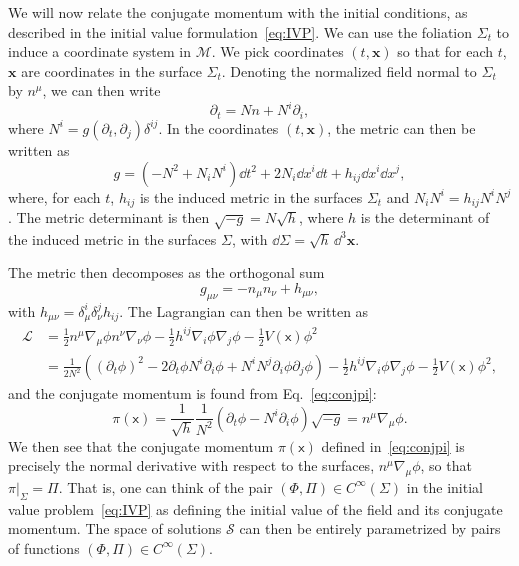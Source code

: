 \documentclass[letterpaper,12pt,titlepage,oneside,final]{book}
\newcommand{\M}{\mathcal{M}}
\newcommand{\mf}{\mathsf}%
\begin{document}
We will now relate the conjugate momentum with the initial conditions, as described in the initial value formulation~\eqref{eq:IVP}. We can use the foliation $\Sigma_t$ to induce a coordinate system in $\M$. We pick coordinates $(t,\bm x)$ so that for each $t$, $\bm x$ are coordinates in the surface $\Sigma_t$. Denoting the normalized field normal to $\Sigma_t$ by $n^\mu$, we can then write
\begin{equation}
    \partial_t = N n+N^i \partial_i,
\end{equation}
where $N^i = g(\partial_t,\partial_j)\delta^{ij}$. In the coordinates $(t,\bm x)$, the metric can then be written as
\begin{equation}
    g = (-N^2+N_iN^i) \dd t^2 + 2 N_i \dd x^i \dd t + h_{ij}\dd x^i \dd x^j,
\end{equation}
where, for each $t$, $h_{ij}$ is the induced metric in the surfaces $\Sigma_t$ and $N_iN^i = h_{ij}N^iN^j$. The metric determinant is then $\sqrt{-g} = N\sqrt{h}$, where $h$ is the determinant of the induced metric in the surfaces $\Sigma$, with $\dd \Sigma = \sqrt{h}\,\dd^3\bm x$. 

The metric then decomposes as the orthogonal sum 
\begin{equation}
    g_{\mu\nu} = -n_{\mu}n_\nu + h_{\mu\nu},
\end{equation}
with $h_{\mu\nu} = \delta_\mu^i\delta_\nu^j h_{ij}$. The Lagrangian can then be written as
\begin{align}
    \mathcal{L} &= \frac{1}{2} n^\mu \nabla_\mu \phi n^\nu \nabla_\nu \phi - \frac{1}{2}h^{ij}\nabla_{i}\phi\nabla_j\phi - \frac{1}{2}V(\mf x) \phi^2 \\
    &=   \frac{1}{2N^2}((\partial_t\phi)^2 - 2 \partial_t\phi N^i \partial_i\phi + N^i N^j \partial_i \phi \partial_j \phi) - \frac{1}{2}h^{ij}\nabla_i\phi\nabla_j \phi- \frac{1}{2}V(\mf x) \phi^2,
\end{align}
and the conjugate momentum is found from Eq.~\eqref{eq:conjpi}:
\begin{equation}
    \pi(\mf x) = \frac{1}{\sqrt{h}}\frac{1}{N^2}(\partial_t\phi - N^i \partial_i\phi)\sqrt{-g} = n^\mu \nabla_\mu \phi.
\end{equation}
We then see that the conjugate momentum $\pi(\mf x)$ defined in~\eqref{eq:conjpi} is precisely the normal derivative with respect to the surfaces, $n^\mu \nabla_\mu\phi$, so that $\pi|_\Sigma = \Pi$. That is, one can think of the pair $(\Phi,\Pi)\in C^{\infty}(\Sigma)$ in the initial value problem~\eqref{eq:IVP} as defining the initial value of the field and its conjugate momentum. The space of solutions $\mathcal{S}$ can then be entirely parametrized by pairs of functions $(\Phi,\Pi)\in C^{\infty}(\Sigma)$.
\end{document}
